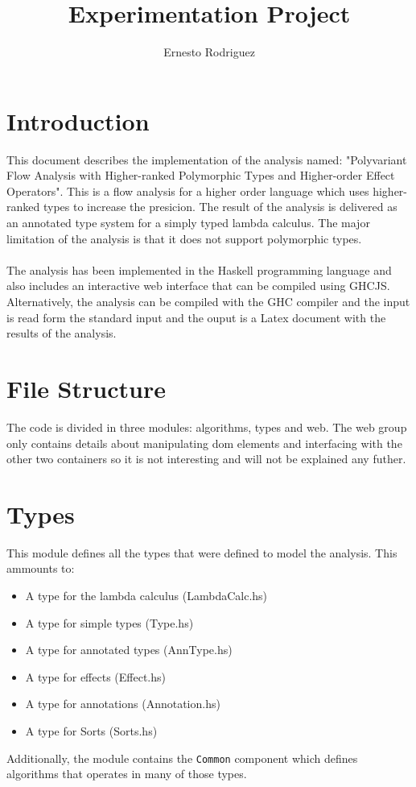 \documentclass[8pt]{extarticle}
\title{Experimentation Project}
\author{Ernesto Rodriguez}
\begin{document}
\maketitle
\section{Introduction}
This document describes the implementation of the analysis named: "Polyvariant Flow Analysis with Higher-ranked Polymorphic Types and Higher-order Effect Operators". This is a flow analysis for a higher order language which uses higher-ranked types to increase the presicion. The result of the analysis is delivered as an annotated type system for a simply typed lambda calculus. The major limitation of the analysis is that it does not support polymorphic types.
\\\\
The analysis has been implemented in the Haskell programming language and also includes an interactive web interface that can be compiled using GHCJS\cite{GHCJS}. Alternatively, the analysis can be compiled with the GHC compiler and the input is read form the standard input and the ouput is a Latex document with the results of the analysis.
\section{File Structure}
The code is divided in three modules: algorithms, types and web. The web group only contains details about manipulating dom elements and interfacing with the other two containers so it is not interesting and will not be explained any futher.
\section{Types}
This module defines all the types that were defined to model the analysis. This ammounts to:
\begin{itemize}
\item A type for the lambda calculus (LambdaCalc.hs)
\item A type for simple types (Type.hs)
\item A type for annotated types (AnnType.hs)
\item A type for effects (Effect.hs)
\item A type for annotations (Annotation.hs)
\item A type for Sorts (Sorts.hs)
\end{itemize}
Additionally, the module contains the \verb+Common+ component which defines algorithms that operates in many of those types.
\end{document}
